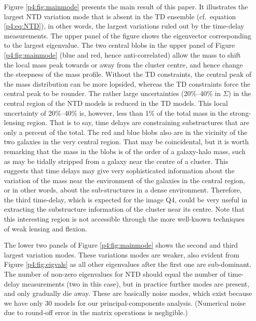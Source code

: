 \documentclass[
  11pt,
  twoside,
  openright,
  titlepage,
  headings=optiontoheadandtoc
]{scrbook}
\begin{document}
Figure \ref{p4:fig:mainmode} presents the main result of this paper.  It
illustrates the largest NTD variation mode that is absent in the TD
ensemble (cf.\ equation \ref{p4:eq:NTD}), in other words, the largest
variations ruled out by the time-delay measurements.  The upper panel
of the figure shows the eigenvector corresponding to the largest
eigenvalue.  The two central blobs in the upper panel of Figure
\ref{p4:fig:mainmode} (blue and red, hence anti-correlated) allow the
mass to shift the local mass peak towards or away from the cluster
centre, and hence change the steepness of the mass profile. Without
the TD constraints, the central peak of the mass distribution can be
 more lopsided, whereas the TD constraints force the central peak to
be rounder.  The rather large uncertainties (20\%--40\% in $\Sigma$)
in the central region of the NTD models is reduced in the TD
models. This local uncertainty of 20\%--40\% is, however, less than
1\% of the total mass in the strong-lensing region.  That is to say,
time delays are constraining substructures that are only a percent of
the total.  The red and blue blobs also are in the vicinity of
the two galaxies in the very central region.  That may be coincidental,
but it is worth remarking that the mass in the blobs is of the order of a
galaxy-halo mass, such as may be tidally stripped from a galaxy near
the centre of a cluster.  This suggests that time delays may give very
sophisticated information about the variation of the mass near the
environment of the galaxies in the central region, or in other words,
about the sub-structures in a dense environment. Therefore, the third
time-delay, which is expected for the image Q4, could be very useful
in extracting the substructure information of the cluster near its
centre.  Note that this interesting region is not accessible through
the more well-known techniques of weak lensing and flexion.

The lower two panels of Figure \ref{p4:fig:mainmode} shows the second and
third largest variation modes. These variations modes are weaker,
also evident from Figure \ref{p4:fig:eigvals} as all other
eigenvalues after the first one are sub-dominant.  The number of
non-zero eigenvalues for NTD should equal the number of time-delay
measurements (two in this case), but in practice further modes are
present, and only gradually die away.  These are basically noise
modes, which exist because we have only 30 models for our
principal-components analysis.  (Numerical noise due to round-off
error in the matrix operations is negligible.)
\end{document}
